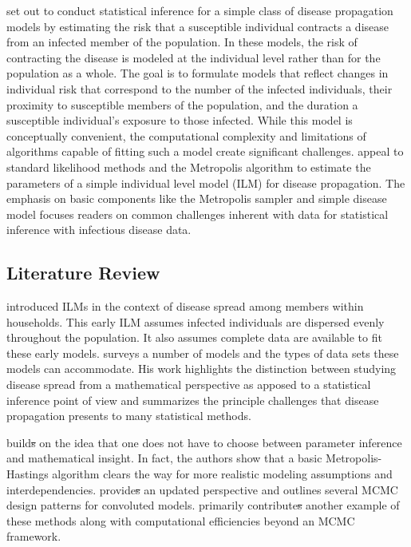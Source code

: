 \documentclass{uwstat572}
\newcommand{\vmdel}[1]{\sout{#1}}
\begin{document}
\citet{Brown} set out to conduct statistical inference for a simple class of disease propagation models by estimating the risk that a susceptible individual contracts a disease from an infected member of the population. 
In these models, the risk of contracting the disease is modeled at the individual level rather than for the population as a whole. 
The goal is to formulate models that reflect changes in individual risk that correspond to the number of the infected individuals, their proximity to susceptible members of the population, and the duration a susceptible individual's exposure to those infected. 
While this model is conceptually convenient, the computational complexity and limitations of algorithms capable of fitting such a model create significant challenges.
\citet{Brown} appeal to standard likelihood methods and the Metropolis algorithm \citep{Metropolis} to estimate the parameters of a simple individual level model (ILM) for disease propagation.
The emphasis on basic components like the Metropolis sampler and simple disease model focuses readers on common challenges inherent with data for statistical inference with infectious disease data. 

\subsection{Literature Review}
\label{literature_review}
\citet{Haber} introduced ILMs in the context of disease spread among members within households. 
This early ILM assumes infected individuals are dispersed evenly throughout the population. 
It also assumes complete data are available to fit these early models. 
\citet{Becker} surveys a number of models and the types of data sets these models can accommodate. 
His work highlights the distinction between studying disease spread from a mathematical perspective as apposed to a statistical inference point of view and summarizes the principle challenges that disease propagation presents to many statistical methods.

\citet{ONeill} build\vmdel{s} on the idea that one does not have to choose between parameter inference and mathematical insight. 
In fact, the authors show that a basic Metropolis-Hastings algorithm clears the way for more realistic modeling assumptions and interdependencies. 
\citet{Jewell} provide\vmdel{s} an updated perspective and outlines several MCMC design patterns for convoluted models.
\citet{Brown} primarily contribute\vmdel{s} another example of these methods along with computational efficiencies beyond an MCMC framework. 
\end{document}
